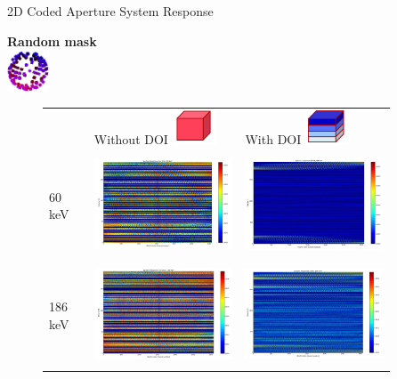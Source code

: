 \documentclass[xcolor=x11names,compress]{beamer}
\renewcommand{\(}{\begin{columns}}
\renewcommand{\)}{\end{columns}}
\newcommand{\<}[1]{\begin{column}{#1}}
\renewcommand{\>}{\end{column}}
\begin{document}
\begin{frame}{2D Coded Aperture System Response}

\textbf{Random mask}\\ [1ex]
\includegraphics[height=35pt, width=35pt]{Figures/RandMask.png}

\vspace{-60pt}
\begin{figure}
\begin{tabular}{m{0.12\linewidth} m{0.4\linewidth} m{0.4\linewidth}}
	& Without DOI \includegraphics[height=0.4in]{Figures/noDOI.png} & 
	With DOI \includegraphics[height=0.4in]{Figures/DOIbins.png} \\
	\small{60 keV} & \includegraphics[height=85pt]{Figures/SystemResponse_60_noDOI.png} & 
	\includegraphics[height=85pt]{Figures/SystemResponse_60_DOI.png} \\ 
	\small{186 keV} & \includegraphics[height=85pt]{Figures/SystemResponse_186_noDOI.png} & 
	\includegraphics[height=85pt]{Figures/SystemResponse_186_DOI.png}
\end{tabular}
\end{figure}


\end{frame}
\end{document}
